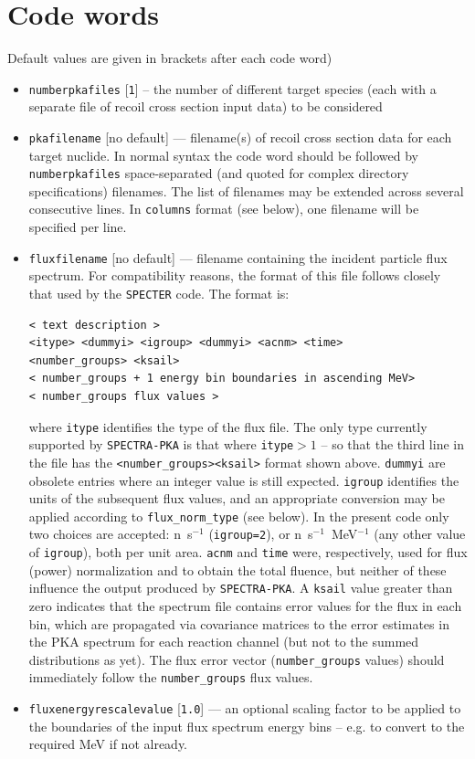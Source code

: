 \documentclass[a4paper]{article}
\begin{document}
\section{Code words}
Default values are given in brackets after each code word)
\begin{itemize}


\item \texttt{number{\textunderscore}pka{\textunderscore}files} [\texttt{1}] -- the number of different target species (each with a separate file of recoil cross section input data) to be considered
\item \texttt{pka{\textunderscore}filename} [no default] --- filename(s) of recoil cross section data for each target nuclide. In normal syntax the code word should be followed by \texttt{number{\textunderscore}pka{\textunderscore}files} space-separated (and quoted for complex directory specifications) filenames. The list of filenames may be extended across several consecutive lines. In \texttt{columns} format (see below), one filename will be specified per line.
\item \texttt{flux{\textunderscore}filename} [no default] --- filename containing the incident particle flux spectrum. For compatibility reasons, the format of this file follows closely that used by the \texttt{SPECTER} code. The format is:\\
    \begin{verbatim}
< text description >
<itype> <dummyi> <igroup> <dummyi> <acnm> <time>
<number_groups> <ksail>
< number_groups + 1 energy bin boundaries in ascending MeV>
< number_groups flux values >
    \end{verbatim}
    where \texttt{itype} identifies the type of the flux file. The only type currently supported by \texttt{SPECTRA-PKA} is that where \texttt{itype}\(>1\) -- so that the third line in the file has the \verb|<number_groups><ksail>| format shown above. \texttt{dummyi} are obsolete entries where an integer value is still expected. \texttt{igroup} identifies the units of the subsequent flux values, and an appropriate conversion may be applied according to \verb|flux_norm_type| (see below). In the present code only two choices are accepted: n~s\(^{-1}\) (\texttt{igroup=2}), or n~s\(^{-1}\)~MeV\(^{-1}\) (any other value of \texttt{igroup}), both per unit area. \texttt{acnm} and \texttt{time} were, respectively, used for flux (power) normalization and to obtain the total fluence, but neither of these influence the output produced by \texttt{SPECTRA-PKA}. A \texttt{ksail} value greater than zero indicates that the spectrum file contains error values for the flux in each bin, which are propagated via covariance matrices to the error estimates in the PKA spectrum for each reaction channel (but not to the summed distributions as yet). The flux error vector (\verb|number_groups| values) should immediately follow the \verb|number_groups| flux values.
\item \texttt{flux{\textunderscore}energy{\textunderscore}rescale{\textunderscore}value} [\texttt{1.0}] --- an optional scaling factor to be applied to the boundaries of the input flux spectrum energy bins -- e.g. to convert to the required MeV if not already.


\end{itemize}
\end{document}
